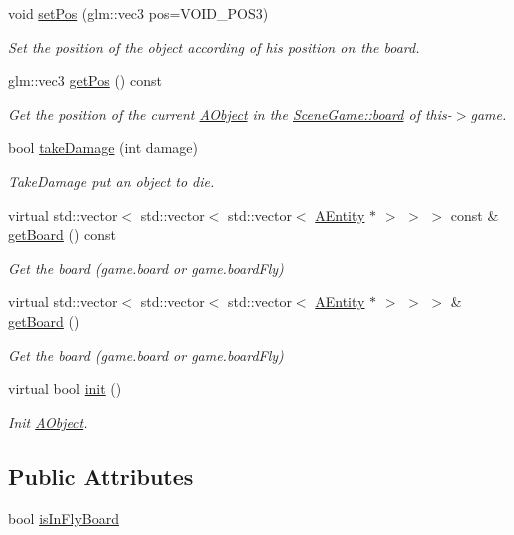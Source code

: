 \begin{DoxyCompactItemize}
void \hyperlink{class_a_object_ac254ff8c08640e01dd5fbe030b4d89bc}{set\+Pos} (glm\+::vec3 pos=V\+O\+I\+D\+\_\+\+P\+O\+S3)
\begin{DoxyCompactList}\small\item\em Set the position of the object according of his position on the board. \end{DoxyCompactList}\item 
glm\+::vec3 \hyperlink{class_a_object_ab5840de6100bba8bf93a186a0a802708}{get\+Pos} () const
\begin{DoxyCompactList}\small\item\em Get the position of the current \hyperlink{class_a_object}{A\+Object} in the \hyperlink{class_scene_game_a2306af8a268c9d476d1060fa3daa1ac5}{Scene\+Game\+::board} of this-\/$>$game. \end{DoxyCompactList}\item 
bool \hyperlink{class_a_object_a39b1720ae5a820512ab4db0906f03b15}{take\+Damage} (int damage)
\begin{DoxyCompactList}\small\item\em Take\+Damage put an object to die. \end{DoxyCompactList}\item 
virtual std\+::vector$<$ std\+::vector$<$ std\+::vector$<$ \hyperlink{class_a_entity}{A\+Entity} $\ast$ $>$ $>$ $>$ const  \& \hyperlink{class_a_object_ac4a82eef484c0f7bf3547a7f7f6dce7e}{get\+Board} () const
\begin{DoxyCompactList}\small\item\em Get the board (game.\+board or game.\+board\+Fly) \end{DoxyCompactList}\item 
virtual std\+::vector$<$ std\+::vector$<$ std\+::vector$<$ \hyperlink{class_a_entity}{A\+Entity} $\ast$ $>$ $>$ $>$ \& \hyperlink{class_a_object_aba4b07c0456b2c3d42a71529ef40f2d5}{get\+Board} ()
\begin{DoxyCompactList}\small\item\em Get the board (game.\+board or game.\+board\+Fly) \end{DoxyCompactList}\item 
virtual bool \hyperlink{class_a_object_afa83ef1c900a47453524219788327b86}{init} ()
\begin{DoxyCompactList}\small\item\em Init \hyperlink{class_a_object}{A\+Object}. \end{DoxyCompactList}\end{DoxyCompactItemize}
\subsection*{Public Attributes}
\begin{DoxyCompactItemize}
\item 
bool \hyperlink{class_a_object_a32efabd4a159239aaebc75c15e542a35}{is\+In\+Fly\+Board}
\end{DoxyCompactItemize}
